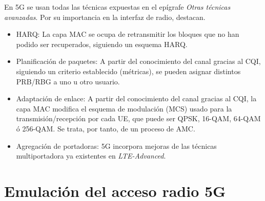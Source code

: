 \documentclass[12pt]{report} %
\begin{document}
En 5G se usan todas las técnicas expuestas en el epígrafe \textit{Otras técnicas avanzadas}.
Por su importancia en la interfaz de radio, destacan.
\begin{itemize}
\item HARQ:
La capa MAC se ocupa de retransmitir los bloques que no han podido ser recuperados, siguiendo un esquema HARQ.
\cite{RefWorks:7}
\item Planificación de paquetes:
A partir del conocimiento del canal gracias al CQI, siguiendo un criterio establecido (métricas), se pueden asignar distintos PRB/RBG a uno u otro usuario.
\cite{RefWorks:7}
\item Adaptación de enlace:
A partir del conocimiento del canal gracias al CQI,
la capa MAC modifica el esquema de modulación (MCS) usado para la transmisión/recepción por cada UE,
que puede ser QPSK, 16-QAM, 64-QAM ó 256-QAM.
Se trata, por tanto, de un proceso de AMC.
\cite{RefWorks:7, RefWorks:42}
\item Agregación de portadoras:
5G incorpora mejoras de las técnicas multiportadora ya existentes en \textit{LTE-Advanced}.
\cite{RefWorks:44, RefWorks:42}
\end{itemize}

\section{Emulación del acceso radio 5G}

\end{document}
